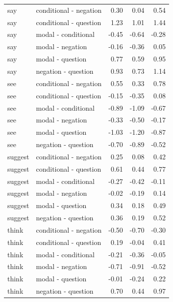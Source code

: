 \documentclass[a4paper,12pt,twoside]{article}
\begin{document}
\begin{longtable}{llrrr}
      say & conditional - negation & 0.30 & 0.04 & 0.54 \\ 
      say & conditional - question & 1.23 & 1.01 & 1.44 \\ 
      say & modal - conditional & -0.45 & -0.64 & -0.28 \\ 
      say & modal - negation & -0.16 & -0.36 & 0.05 \\ 
      say & modal - question & 0.77 & 0.59 & 0.95 \\ 
      say & negation - question & 0.93 & 0.73 & 1.14 \\ \midrule

      see & conditional - negation & 0.55 & 0.33 & 0.78 \\ 
      see & conditional - question & -0.15 & -0.35 & 0.08 \\ 
      see & modal - conditional & -0.89 & -1.09 & -0.67 \\ 
      see & modal - negation & -0.33 & -0.50 & -0.17 \\ 
      see & modal - question & -1.03 & -1.20 & -0.87 \\ 
      see & negation - question & -0.70 & -0.89 & -0.52 \\ \midrule

      suggest & conditional - negation & 0.25 & 0.08 & 0.42 \\ 
      suggest & conditional - question & 0.61 & 0.44 & 0.77 \\ 
      suggest & modal - conditional & -0.27 & -0.42 & -0.11 \\ 
      suggest & modal - negation & -0.02 & -0.19 & 0.14 \\ 
      suggest & modal - question & 0.34 & 0.18 & 0.49 \\ 
      suggest & negation - question & 0.36 & 0.19 & 0.52 \\ \midrule

      think & conditional - negation & -0.50 & -0.70 & -0.30 \\ 
      think & conditional - question & 0.19 & -0.04 & 0.41 \\ 
      think & modal - conditional & -0.21 & -0.36 & -0.05 \\ 
      think & modal - negation & -0.71 & -0.91 & -0.52 \\ 
      think & modal - question & -0.01 & -0.24 & 0.22 \\ 
      think & negation - question & 0.70 & 0.44 & 0.97 \\ 
      \end{longtable}
\end{document}
